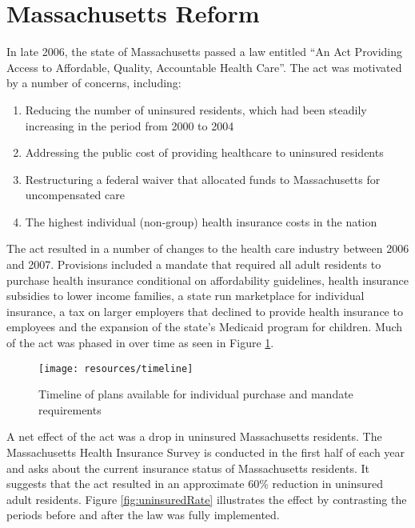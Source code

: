 \documentclass[12pt]{article}
\begin{document}
\section{Massachusetts Reform}
\label{sec:reform}


In late 2006, the state of Massachusetts passed a law entitled ``An Act Providing Access to Affordable, Quality, Accountable Health Care''. The act was motivated by a number of concerns, including:

\begin{enumerate}
\item Reducing the number of uninsured residents, which had been steadily increasing in the period from 2000 to 2004 \cite{bisweek}
\item Addressing the public cost of providing healthcare to uninsured residents \cite{npr}
\item Restructuring a federal waiver that allocated funds to Massachusetts for uncompensated care \cite{heritage}
\item The highest individual (non-group) health insurance costs in the nation \cite{gruber}
\end{enumerate}

The act resulted in a number of changes to the health care industry between 2006 and 2007. Provisions included a mandate that required all adult residents to purchase health insurance conditional on affordability guidelines, health insurance subsidies to lower income families, a state run marketplace for individual insurance, a tax on larger employers that declined to provide health insurance to employees and the expansion of the state's Medicaid program for children. Much of the act was phased in over time as seen in Figure \ref{fig:reformTimeline}.

\begin{figure}[H]
	\centering
	\texttt{[image: resources/timeline]}
	\caption{Timeline of plans available for individual purchase and mandate requirements}
	\label{fig:reformTimeline}
\end{figure}

A net effect of the act was a drop in uninsured Massachusetts residents. The Massachusetts Health Insurance Survey is conducted in the first half of each year and asks about the current insurance status of Massachusetts residents. It suggests that the act resulted in an approximate 60\% reduction in uninsured adult residents. Figure \ref{fig:uninsuredRate} illustrates the effect by contrasting the periods before and after the law was fully implemented. 
\end{document}
